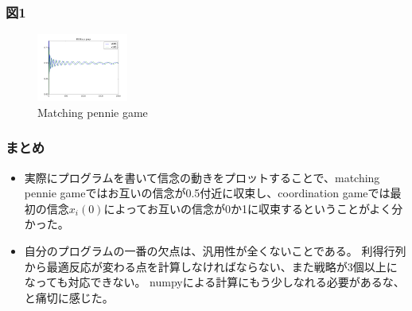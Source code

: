 \documentclass[dvipdfmx,fleqn]{beamer}
\begin{document}
\begin{frame}
\frametitle{図1}
\begin{figure}
 \centering
 \includegraphics[bb=0 0 240 180, width = 3cm]{fictitious_play.png}
 \caption{Matching pennie game}
 \label{fig:matchingpennies_plot}
\end{figure}
\end{frame}



\begin{frame}
\frametitle{まとめ}
\begin{itemize}\setlength{\parskip}{0.5em}

\item
実際にプログラムを書いて信念の動きをプロットすることで、matching pennie gameではお互いの信念が0.5付近に収束し、coordination gameでは最初の信念$x_{i} (0)$によってお互いの信念が0か1に収束するということがよく分かった。

\item
自分のプログラムの一番の欠点は、汎用性が全くないことである。
利得行列から最適反応が変わる点を計算しなければならない、また戦略が3個以上になっても対応できない。
numpyによる計算にもう少しなれる必要があるな、と痛切に感じた。



\end{itemize}
\end{frame}
\end{document}
